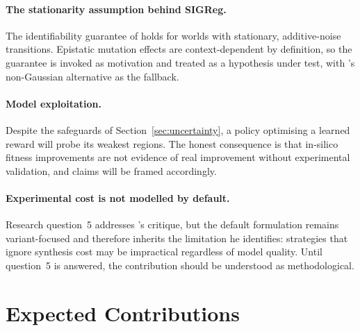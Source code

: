 \documentclass[12pt, a4paper]{article}
\begin{document}
\paragraph{The stationarity assumption behind SIGReg.} The identifiability guarantee of \citet{klindt2026whenlejepa} holds for worlds with stationary, additive-noise transitions. Epistatic mutation effects are context-dependent by definition, so the guarantee is invoked as motivation and treated as a hypothesis under test, with \citet{boylan2026nogaussian}'s non-Gaussian alternative as the fallback.

\paragraph{Model exploitation.} Despite the safeguards of Section~\ref{sec:uncertainty}, a policy optimising a learned reward will probe its weakest regions. The honest consequence is that in-silico fitness improvements are not evidence of real improvement without experimental validation, and claims will be framed accordingly.

\paragraph{Experimental cost is not modelled by default.} Research question~5 addresses \citet{wittmann2026retrospective}'s critique, but the default formulation remains variant-focused and therefore inherits the limitation he identifies: strategies that ignore synthesis cost may be impractical regardless of model quality. Until question~5 is answered, the contribution should be understood as methodological.

\section{Expected Contributions}
\label{sec:contributions}
\end{document}

